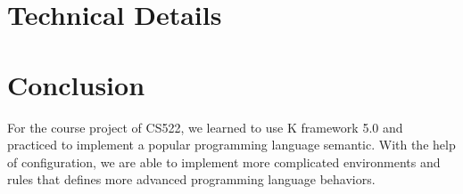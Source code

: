 \documentclass[a4paper]{article}
\begin{document}
\section{Technical Details}

\section{Conclusion}

For the course project of CS522, we learned to use K framework 5.0 and practiced to implement a popular programming language semantic. With the help of configuration, we are able to implement more complicated environments and rules that defines more advanced programming language behaviors.
\end{document}
